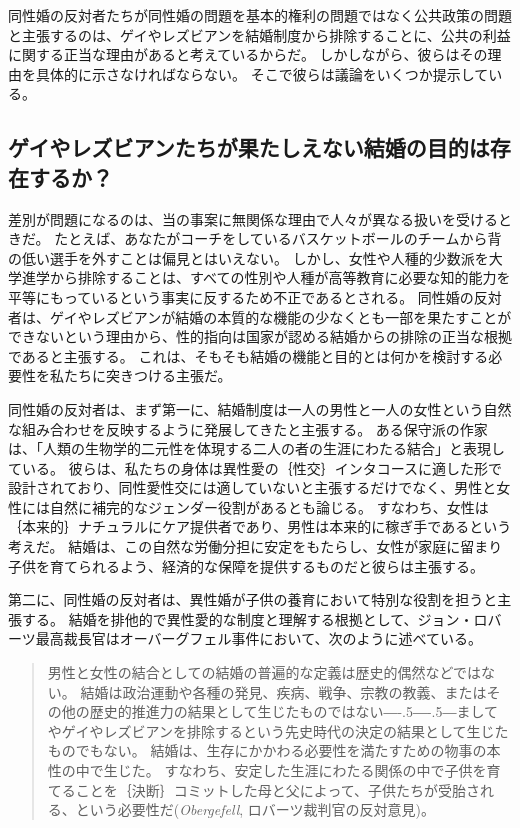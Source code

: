 \documentclass[paper=a4,book,openany]{jlreq}
\newcommand{\ig}[1]{}           %
\def\DDASH{―\kern-.5\zw―\kern-.5\zw―} %
\begin{document}
同性婚の反対者たちが同性婚の問題を基本的権利の問題ではなく公共政策の問題と主張するのは、ゲイやレズビアンを結婚制度から排除することに、公共の利益に関する正当な理由があると考えているからだ。
しかしながら、彼らはその理由を具体的に示さなければならない。
そこで彼らは議論をいくつか提示している。

\subsection{ゲイやレズビアンたちが果たしえない結婚の目的は存在するか？}

差別が問題になるのは、当の事案に無関係な理由で人々が異なる扱いを受けるときだ。
たとえば、あなたがコーチをしているバスケットボールのチームから背の低い選手を外すことは偏見とはいえない。
しかし、女性や人種的少数派を大学進学から排除することは、すべての性別や人種が高等教育に必要な知的能力を平等にもっているという事実に反するため不正であるとされる。
同性婚の反対者は、ゲイやレズビアンが結婚の本質的な機能の少なくとも一部を果たすことができないという理由から、性的指向は国家が認める結婚からの排除の正当な根拠であると主張する。
これは、そもそも結婚の機能と目的とは何かを検討する必要性を私たちに突きつける主張だ。

同性婚の反対者は、まず第一に、結婚制度は一人の男性と一人の女性という自然な組み合わせを反映するように発展してきたと主張する。
ある保守派の作家は、「人類の生物学的二元性を体現する二人の者の生涯にわたる結合」と表現している\citep{jensen15:_i_oppos_same_sex_marriag}。
彼らは、私たちの身体は異性愛の｛性交｝{インタコース}に適した形で設計されており、同性愛性交には適していないと主張するだけでなく、男性と女性には自然に補完的なジェンダー役割があるとも論じる。
すなわち、女性は｛本来的｝{ナチュラル}にケア提供者であり、男性は本来的に稼ぎ手であるという考えだ。
結婚は、この自然な労働分担に安定をもたらし、女性が家庭に留まり子供を育てられるよう、経済的な保障を提供するものだと彼らは主張する。

第二に、同性婚の反対者は、異性婚が子供の養育において特別な役割を担うと主張する。
結婚を排他的で異性愛的な制度と理解する根拠として、ジョン・ロバーツ\ig{John Roberts}最高裁長官はオーバーグフェル事件において、次のように述べている。

\begin{quote}
男性と女性の結合としての結婚の普遍的な定義は歴史的偶然などではない。
結婚は政治運動や各種の発見、疾病、戦争、宗教の教義、またはその他の歴史的推進力の結果として生じたものではない{\DDASH}ましてやゲイやレズビアンを排除するという先史時代の決定の結果として生じたものでもない。
結婚は、生存にかかわる必要性を満たすための物事の本性の中で生じた。
すなわち、安定した生涯にわたる関係の中で子供を育てることを｛決断｝{コミット}した母と父によって、子供たちが受胎される、という必要性だ(\emph{Obergefell}, ロバーツ裁判官の反対意見)\ig{John Roberts}。

\end{quote}
\end{document}
